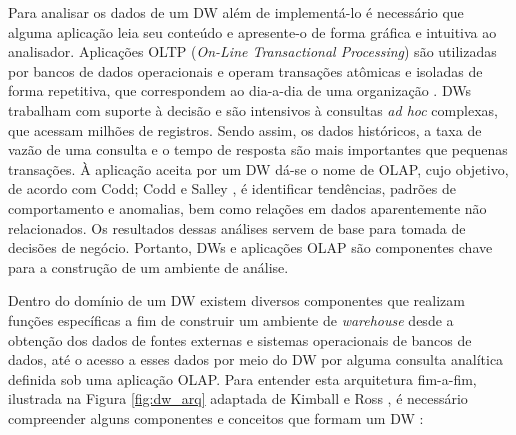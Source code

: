 Para analisar os dados de um DW além de implementá-lo é necessário que alguma aplicação leia seu conteúdo e apresente-o de forma gráfica e intuitiva ao analisador. Aplicações OLTP (\textit{On-Line Transactional Processing}) são utilizadas por bancos de dados operacionais e operam transações atômicas e isoladas de forma repetitiva, que correspondem ao dia-a-dia de uma organização \cite{chaudhuri1997overview}. DWs trabalham com suporte à decisão e são intensivos à consultas \textit{ad hoc} complexas, que acessam milhões de registros. Sendo assim, os dados históricos, a taxa de vazão de uma consulta e o tempo de resposta são mais importantes que pequenas transações. À aplicação aceita por um DW dá-se o nome de OLAP, cujo objetivo, de acordo com Codd; Codd e Salley \cite{codd1998providing}, é identificar tendências, padrões de comportamento e anomalias, bem como relações em dados aparentemente não relacionados. Os resultados dessas análises servem de base para tomada de decisões de negócio. Portanto, DWs e aplicações OLAP são componentes chave para a construção de um ambiente de análise.

Dentro do domínio de um DW existem diversos componentes que realizam funções específicas a fim de construir um ambiente de \textit{warehouse} desde a obtenção dos dados de fontes externas e sistemas operacionais de bancos de dados, até o acesso a esses dados por meio do DW por alguma consulta analítica definida sob uma aplicação OLAP. Para entender esta arquitetura fim-a-fim, ilustrada na Figura \ref{fig:dw_arq} adaptada de Kimball e Ross \cite{kimball2002dw}, é necessário compreender alguns componentes e conceitos que formam um DW \cite{kimball2002dw}:

